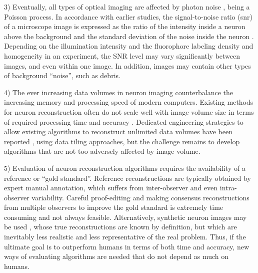 3) Eventually, all types of optical imaging are affected by photon noise \cite{van1998digital}, being a Poisson process. In accordance with earlier studies, the signal-to-noise ratio (\gls{snr}) of a microscope image is expressed as the ratio of the intensity inside a neuron above the background and the standard deviation of the noise inside the neuron \cite{cheezum2001quantitative, smal2010quantitative}. Depending on the illumination intensity and the fluorophore labeling density and homogeneity in an experiment, the SNR level may vary significantly between images, and even within one image. In addition, images may contain other types of background ``noise'', such as debris.

4) The ever increasing data volumes in neuron imaging counterbalance the increasing memory and processing speed of modern computers. Existing methods for neuron reconstruction often do not scale well with image volume size in terms of required processing time and accuracy \cite{peng2017automatic}. Dedicated engineering strategies to allow existing algorithms to reconstruct unlimited data volumes have been reported \cite{peng2017automatic, zhou2015neuron}, using data tiling approaches, but the challenge remains to develop algorithms that are not too adversely affected by image volume.

5) Evaluation of neuron reconstruction algorithms requires the availability of a reference or ``gold standard''. Reference reconstructions are typically obtained by expert manual annotation, which suffers from inter-observer and even intra-observer variability. Careful proof-editing \cite{peng2011proof} and making consensus reconstructions from multiple observers \cite{peng2015bigneuron} to improve the gold standard is extremely time consuming and not always feasible. Alternatively, synthetic neuron images may be used \cite{koene2009netmorph, radojevic2016fuzzy, radojevic-pnr}, whose true reconstructions are known by definition, but which are inevitably less realistic and less representative of the real problem. Thus, if the ultimate goal is to outperform humans in terms of both time and accuracy, new ways of evaluating algorithms are needed that do not depend as much on humans.

